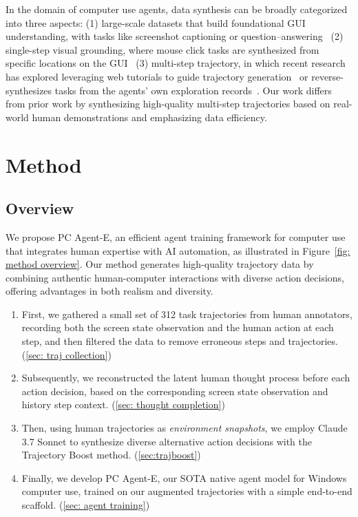 \documentclass{article} %
\renewcommand{\cite}{\citep}
\begin{document}
In the domain of computer use agents, data synthesis can be broadly categorized into three aspects: (1) large-scale datasets that build foundational GUI understanding, with tasks like screenshot captioning or question–answering~\cite{liu2024harnessingwebpageuistextrich, uitars2025} (2) single-step visual grounding, where mouse click tasks are synthesized from specific locations on the GUI~\cite{gou2025navigatingdigitalworldhumans, wu2024osatlasfoundationactionmodel}
 (3) multi-step trajectory, in which recent research has explored leveraging web tutorials to guide trajectory generation~\cite{ou2024synatraturningindirectknowledge, xu2025agenttrekagenttrajectorysynthesis} or reverse-synthesizes tasks from the agents' own exploration records~\cite{sun2025osgenesisautomatingguiagent, murty2024nnetscape}. 
 Our work differs from prior work by synthesizing high-quality multi-step trajectories based on real-world human demonstrations and emphasizing data efficiency.

\section{Method}


\subsection{Overview}

We propose {PC Agent-E}, an efficient agent training framework for computer use that integrates human expertise with AI automation, as illustrated in Figure~\ref{fig: method overview}. Our method generates high-quality trajectory data by combining authentic human-computer interactions with diverse action decisions, offering advantages in both realism and diversity.


\begin{enumerate}
    \item First, we gathered a small set of 312 task trajectories from human annotators, recording both the screen state observation and the human action at each step, and then filtered the data to remove erroneous steps and trajectories. (\autoref{sec: traj collection})
    \item Subsequently, we reconstructed the latent human thought process before each action decision, based on the corresponding screen state observation and history step context. (\autoref{sec: thought completion})
    \item Then, using human trajectories as \textit{environment snapshots}, we employ Claude 3.7 Sonnet to synthesize diverse alternative action decisions with the Trajectory Boost method. (\autoref{sec:trajboost}) 
    \item Finally, we develop PC Agent-E, our SOTA native agent model for Windows computer use, trained on our augmented trajectories with a simple end-to-end scaffold. (\autoref{sec: agent training})
\end{enumerate}
\end{document}

